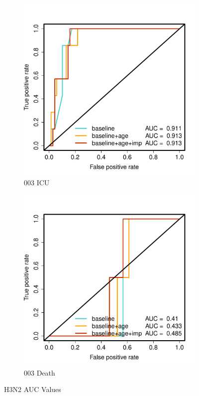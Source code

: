 \documentclass[12pt,twoside]{article}
\begin{document}
\begin{figure}[h]
        \begin{subfigure}{.475\textwidth}
            \includegraphics[width=\textwidth]{003ICU_AUC_H3N2.pdf}
            \caption{003 ICU}
        \end{subfigure}\hfill
                \begin{subfigure}{.475\textwidth}
            \includegraphics[width=\textwidth]{003Death_AUC_H3N2.pdf}
            \caption{003 Death}
        \end{subfigure}\hfill
        \caption[Network]{H3N2 AUC Values}
        
        \end{figure}
\end{document}
